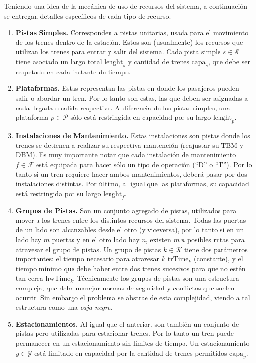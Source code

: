 \documentclass[letter, 10pt]{article}
\begin{document}
\begin{description}
    Teniendo una idea de la mecánica de uso de recursos del sistema, a continuación se entregan detalles específicos de cada tipo de recurso.
    \begin{enumerate}
        \item \textbf{Pistas Simples.} Corresponden a pistas unitarias, usada para el movimiento de los trenes dentro de la estación. Estos son (usualmente) los recursos que utilizan los trenes para entrar y salir del sistema. Cada pista simple $s \in \mathcal{S}$ tiene asociado un largo total $\text{lenght}_s$ y cantidad de trenes $\text{capa}_s$,
        que debe ser respetado en cada instante de tiempo.
        \item \textbf{Plataformas.} Estas representan las pistas en donde los pasajeros pueden salir o abordar un tren. Por lo tanto son estas, las que deben ser asignadas a cada llegada o salida respectivo. A diferencia de las pistas simples, una plataforma $p \in \mathcal{P}$ sólo está restringida en capacidad por su largo $\text{lenght}_p$.
        \item \textbf{Instalaciones de Mantenimiento.} Estas instalaciones son pistas donde los trenes se detienen a realizar su respectiva mantención (reajustar su TBM y DBM). Es muy importante notar que cada instalación de mantenimiento $f \in \mathcal{F}$ está equipada para hacer sólo un tipo de operación (``D'' o ``T''). Por lo tanto si un tren requiere hacer ambos mantenimientos, deberá pasar por dos instalaciones distintas. Por último, al igual que las plataformas, su capacidad está restringida por su largo $\text{lenght}_f$.
        \item \textbf{Grupos de Pistas.} Son un conjunto agregado de pistas, utilizados para mover a los trenes entre los distintos recursos del sistema. Todas las puertas de un lado son alcanzables desde el otro (y viceversa), por lo tanto si en un lado hay $m$ puertas y en el otro lado hay $n$, existen $m\ n$ posibles rutas para atravesar el grupo de pistas. Un grupo de pistas $k \in \mathcal{K}$ tiene dos parámetros importantes: el tiempo necesario para atravesar $k$ $\text{trTime}_k$ (constante), y el tiempo mínimo que debe haber entre dos trenes sucesivos para que no estén tan cerca $\text{hwTime}_k$. Técnicamente los grupos de pistas son una estructura compleja, que debe manejar normas de seguridad y conflictos que suelen ocurrir. Sin embargo el problema se abstrae de esta complejidad, viendo a tal estructura como una \textit{caja negra}.
        \item \textbf{Estacionamientos.} Al igual que el anterior, son también un conjunto de pistas pero utilizadas para estacionar trenes. Por lo tanto un tren puede permanecer en un estacionamiento sin limites de tiempo. Un estacionamiento $y \in \mathcal{Y}$ está limitado en capacidad por la cantidad de trenes permitidos $\text{capa}_y$.
    \end{enumerate}



\end{description}
\end{document}
